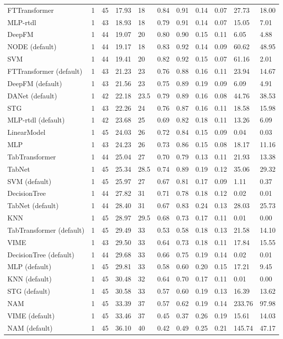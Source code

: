 \begin{tabular}{lllllllllll}
FTTransformer & 1 & 45 & 17.93 & 18 & 0.84 & 0.91 & 0.14 & 0.07 & 27.73 & 18.00 \\
MLP-rtdl & 1 & 43 & 18.93 & 18 & 0.79 & 0.91 & 0.14 & 0.07 & 15.05 & 7.01 \\
DeepFM & 1 & 44 & 19.07 & 20 & 0.80 & 0.90 & 0.15 & 0.11 & 6.05 & 4.88 \\
NODE (default) & 1 & 44 & 19.17 & 18 & 0.83 & 0.92 & 0.14 & 0.09 & 60.62 & 48.95 \\
SVM & 1 & 44 & 19.41 & 20 & 0.82 & 0.92 & 0.15 & 0.07 & 61.16 & 2.01 \\
FTTransformer (default) & 1 & 43 & 21.23 & 23 & 0.76 & 0.88 & 0.16 & 0.11 & 23.94 & 14.67 \\
DeepFM (default) & 1 & 43 & 21.56 & 23 & 0.75 & 0.89 & 0.19 & 0.09 & 6.09 & 4.91 \\
DANet (default) & 1 & 42 & 22.18 & 23.5 & 0.79 & 0.89 & 0.16 & 0.08 & 44.76 & 38.53 \\
STG & 1 & 43 & 22.26 & 24 & 0.76 & 0.87 & 0.16 & 0.11 & 18.58 & 15.98 \\
MLP-rtdl (default) & 1 & 42 & 23.68 & 25 & 0.69 & 0.82 & 0.18 & 0.11 & 13.26 & 6.09 \\
LinearModel & 1 & 45 & 24.03 & 26 & 0.72 & 0.84 & 0.15 & 0.09 & 0.04 & 0.03 \\
MLP & 1 & 43 & 24.23 & 26 & 0.73 & 0.86 & 0.15 & 0.08 & 18.17 & 11.16 \\
TabTransformer & 1 & 44 & 25.04 & 27 & 0.70 & 0.79 & 0.13 & 0.11 & 21.93 & 13.38 \\
TabNet & 1 & 45 & 25.34 & 28.5 & 0.74 & 0.89 & 0.19 & 0.12 & 35.06 & 29.32 \\
SVM (default) & 1 & 45 & 25.97 & 27 & 0.67 & 0.81 & 0.17 & 0.09 & 1.11 & 0.37 \\
DecisionTree & 1 & 44 & 27.82 & 31 & 0.71 & 0.78 & 0.18 & 0.12 & 0.02 & 0.01 \\
TabNet (default) & 1 & 44 & 28.40 & 31 & 0.67 & 0.83 & 0.24 & 0.13 & 28.03 & 25.73 \\
KNN & 1 & 45 & 28.97 & 29.5 & 0.68 & 0.73 & 0.17 & 0.11 & 0.01 & 0.00 \\
TabTransformer (default) & 1 & 45 & 29.49 & 33 & 0.53 & 0.58 & 0.18 & 0.13 & 21.58 & 14.10 \\
VIME & 1 & 43 & 29.50 & 33 & 0.64 & 0.73 & 0.18 & 0.11 & 17.84 & 15.55 \\
DecisionTree (default) & 1 & 44 & 29.68 & 33 & 0.66 & 0.75 & 0.19 & 0.14 & 0.02 & 0.01 \\
MLP (default) & 1 & 45 & 29.81 & 33 & 0.58 & 0.60 & 0.20 & 0.15 & 17.21 & 9.45 \\
KNN (default) & 1 & 45 & 30.48 & 32 & 0.64 & 0.70 & 0.17 & 0.11 & 0.01 & 0.00 \\
STG (default) & 1 & 45 & 30.58 & 33 & 0.57 & 0.60 & 0.19 & 0.13 & 16.39 & 13.62 \\
NAM & 1 & 45 & 33.39 & 37 & 0.57 & 0.62 & 0.19 & 0.14 & 233.76 & 97.98 \\
VIME (default) & 1 & 45 & 33.46 & 37 & 0.45 & 0.37 & 0.26 & 0.19 & 15.61 & 14.03 \\
NAM (default) & 1 & 45 & 36.10 & 40 & 0.42 & 0.49 & 0.25 & 0.21 & 145.74 & 47.17 \\
\bottomrule
\end{tabular}
